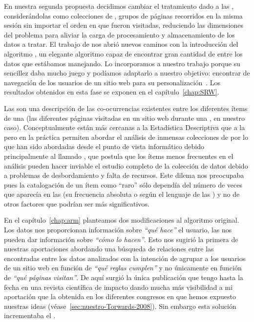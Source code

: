 En nuestra segunda propuesta decidimos cambiar el tratamiento dado a las \sn, considerándolas como colecciones de \transacciones, grupos de páginas recorridos en la misma sesión sin importar el orden en que fueron visitadas, reduciendo las dimensiones del problema para aliviar la carga de procesamiento y almacenamiento de los datos a tratar. El trabajo de \citet{AgrawalSrikant-FastAlgorithmsForMiningAssociationRules-1994} nos abrió nuevos caminos con la introducción del algoritmo \apriori, un elegante algoritmo capaz de encontrar gran cantidad de \ARs entre los datos que estábamos manejando. Lo incorporamos a nuestro trabajo porque su sencillez daba mucho juego y podíamos adaptarlo a nuestro objetivo: encontrar \patrones de navegación de los usuarios de un sitio web para su personalización~\citep{BorgesLevene-DataMiningOfUserNavigationPatterns-1999}. Los resultados obtenidos en esta fase se exponen en el capítulo~\ref{chap:SRW}.

Las \ARs son una descripción de las co-ocurrencias existentes entre los diferentes ítems de una \transaccion (las diferentes páginas visitadas en un sitio web durante una \sn, en nuestro caso). Conceptualmente están más cercanas a la Estadística Descriptiva que a la \DM pero en la práctica permiten abordar el análisis de inmensas colecciones de \transacciones por lo que han sido abordadas desde el punto de vista informático debido principalmente al llamado \dilemaIR, que postula que los ítems menos frecuentes en el análisis pueden hacer inviable el estudio completo de la colección de datos debido a problemas de desbordamiento y falta de recursos. Este dilema nos preocupaba pues la catalogación de un ítem como "`raro"' sólo dependía del número de veces que aparecía en las \transacciones (su frecuencia absoluta o \soporte según el lenguaje de las \ar) y no de otros factores que podrían ser más significativos.

En el capítulo~\ref{chap:arm} planteamos dos modificaciones al algoritmo \apriori original. Los datos nos proporcionan información sobre \textsl{"`qué hace"'} el usuario, las \ars nos pueden dar información sobre \textsl{"`cómo lo hacen"'}. Esto nos sugirió la primera de nuestras aportaciones abordando una búsqueda de relaciones entre las \ars encontradas entre los datos analizados con la intención de agrupar a los usuarios de un sitio web en función de \textsl{"`qué reglas cumplen"'} y no únicamente en función de \textsl{"`qué páginas visitan"'}. De aquí surgió la única publicación que tengo hasta la fecha en una revista científica de impacto dando mucha más visibilidad a mi aportación que la obtenida en los diferentes congresos en que hemos expuesto nuestras ideas (véase~\ref{sec:nuestro-Torwards-2008}). Sin embargo esta solución incrementaba el \dilemaIR.

